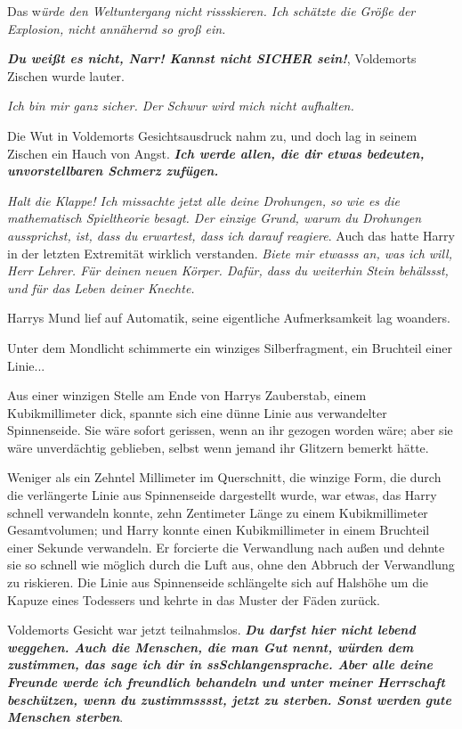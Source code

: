 \glqq{}Das w\emph{ürde den Weltuntergang nicht rissskieren. Ich schätzte die
Größe der Explosion, nicht annähernd so groß ein.}\grqq{}

\glqq{}\textbf{\emph{Du weißt es nicht, Narr! Kannst nicht SICHER sein!}}\grqq{},
Voldemorts Zischen wurde lauter.

\glqq{}\emph{Ich bin mir ganz sicher. Der Schwur wird mich nicht
aufhalten.}\grqq{}

Die Wut in Voldemorts Gesichtsausdruck nahm zu, und doch lag in seinem Zischen
ein Hauch von Angst. \glqq{}\textbf{\emph{Ich werde allen, die dir etwas
bedeuten, unvorstellbaren Schmerz zufügen.}}\grqq{}

\glqq{}\emph{Halt die Klappe! Ich missachte jetzt alle deine Drohungen, so wie es
die mathematisch Spieltheorie besagt. Der einzige Grund, warum du Drohungen
aussprichst, ist, dass du erwartest, dass ich darauf reagiere}.\grqq{} Auch das
hatte Harry in der letzten Extremität wirklich verstanden. \glqq{}\emph{Biete mir
etwasss an, was ich will, Herr Lehrer. Für deinen neuen Körper. Dafür, dass du
weiterhin Stein behälssst, und für das Leben deiner Knechte.}\grqq{}

Harrys Mund lief auf Automatik, seine eigentliche Aufmerksamkeit lag woanders.

Unter dem Mondlicht schimmerte ein winziges Silberfragment, ein Bruchteil einer
Linie...

Aus einer winzigen Stelle am Ende von Harrys Zauberstab, einem Kubikmillimeter
dick, spannte sich eine dünne Linie aus verwandelter Spinnenseide. Sie wäre
sofort gerissen, wenn an ihr gezogen worden wäre; aber sie wäre unverdächtig
geblieben, selbst wenn jemand ihr Glitzern bemerkt hätte.

Weniger als ein Zehntel Millimeter im Querschnitt, die winzige Form, die durch
die verlängerte Linie aus Spinnenseide dargestellt wurde, war etwas, das Harry
schnell verwandeln konnte, zehn Zentimeter Länge zu einem Kubikmillimeter
Gesamtvolumen; und Harry konnte einen Kubikmillimeter in einem Bruchteil einer
Sekunde verwandeln. Er forcierte die Verwandlung nach außen und dehnte sie so
schnell wie möglich durch die Luft aus, ohne den Abbruch der Verwandlung zu
riskieren. Die Linie aus Spinnenseide schlängelte sich auf Halshöhe um die
Kapuze eines Todessers und kehrte in das Muster der Fäden zurück.

Voldemorts Gesicht war jetzt teilnahmslos. \glqq{}\textbf{\emph{Du darfst hier
nicht lebend weggehen. Auch die Menschen, die man Gut nennt, würden dem
zustimmen, das sage ich dir in ssSchlangensprache. Aber alle deine Freunde werde
ich freundlich behandeln und unter meiner Herrschaft beschützen, wenn du
zustimmsssst, jetzt zu sterben. Sonst werden gute Menschen sterben}}.\grqq{}

